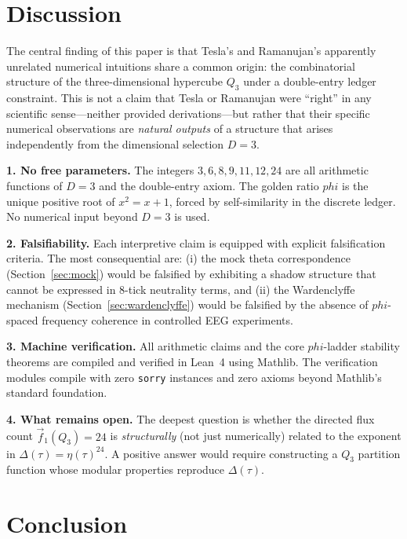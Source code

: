\documentclass[11pt]{article}
\def\phig{phi}
\theoremstyle{plain}
\theoremstyle{definition}
\theoremstyle{remark}
\newcommand{\phig}{\varphi}
\begin{document}
\section{Discussion}
\label{sec:discussion}

The central finding of this paper is that Tesla's and Ramanujan's apparently unrelated numerical intuitions share a common origin: the combinatorial structure of the three-dimensional hypercube $Q_3$ under a double-entry ledger constraint.
This is not a claim that Tesla or Ramanujan were ``right'' in any scientific sense---neither provided derivations---but rather that their specific numerical observations are \emph{natural outputs} of a structure that arises independently from the dimensional selection $D = 3$.

\textbf{1. No free parameters.}
The integers $3, 6, 8, 9, 11, 12, 24$ are all arithmetic functions of $D = 3$ and the double-entry axiom.
The golden ratio $\phig$ is the unique positive root of $x^2 = x + 1$, forced by self-similarity in the discrete ledger.
No numerical input beyond $D = 3$ is used.

\textbf{2. Falsifiability.}
Each interpretive claim is equipped with explicit falsification criteria.
The most consequential are: (i) the mock theta correspondence (Section~\ref{sec:mock}) would be falsified by exhibiting a shadow structure that cannot be expressed in 8-tick neutrality terms, and (ii) the Wardenclyffe mechanism (Section~\ref{sec:wardenclyffe}) would be falsified by the absence of $\phig$-spaced frequency coherence in controlled EEG experiments.

\textbf{3. Machine verification.}
All arithmetic claims and the core $\phig$-ladder stability theorems are compiled and verified in Lean~4 using Mathlib.
The verification modules compile with zero \texttt{sorry} instances and zero axioms beyond Mathlib's standard foundation.

\textbf{4. What remains open.}
The deepest question is whether the directed flux count $\vec{f}_1(Q_3) = 24$ is \emph{structurally} (not just numerically) related to the exponent in $\Delta(\tau) = \eta(\tau)^{24}$.
A positive answer would require constructing a $Q_3$ partition function whose modular properties reproduce $\Delta(\tau)$.

\section{Conclusion}
\label{sec:conclusion}
\end{document}
